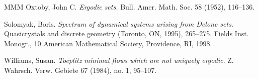 \documentclass[titlepage,reqno,10pt]{amsart}
\theoremstyle{definition}
\begin{document}
\begin{thebibliography}{MMM}
 Oxtoby, John C. {\it Ergodic sets.} Bull. Amer. Math. Soc. 58 (1952), 116--136. 

Solomyak, Boris.
{\it Spectrum of dynamical systems arising from Delone sets}. Quasicrystals and discrete geometry (Toronto, ON, 1995), 265--275. Fields Inst. Monogr., 10 American Mathematical Society, Providence, RI, 1998.

 Williams, Susan.
{\it Toeplitz minimal flows which are not uniquely ergodic}.
Z. Wahrsch. Verw. Gebiete 67 (1984), no. 1, 95--107.







\end{thebibliography}
\end{document}
